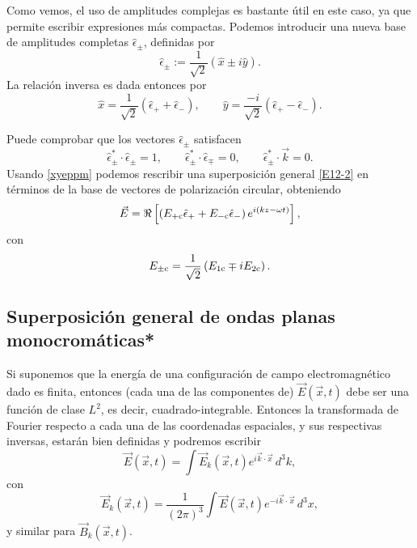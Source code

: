 Como vemos, el uso de amplitudes complejas es bastante útil en este caso, ya que permite escribir expresiones más compactas. Podemos introducir una nueva base de amplitudes completas $\hat\epsilon_\pm$, definidas por
\begin{equation}
\hat\epsilon_\pm := \frac{1}{\sqrt{2}}(\hat{x}\pm i\hat{y}).
\end{equation}
La relación inversa es dada entonces por
\begin{equation}\label{xyeppm}
\hat{x}=\frac{1}{\sqrt{2}}(\hat\epsilon_+ + \hat\epsilon_-), \qquad \hat{y}=\frac{-i}{\sqrt{2}}(\hat\epsilon_+ - \hat\epsilon_-).
\end{equation}

Puede comprobar que los vectores $\hat\epsilon_\pm$ satisfacen
\begin{equation}
\hat\epsilon_\pm^*\cdot\hat\epsilon_\pm = 1, \qquad
\hat\epsilon_\pm^*\cdot\hat\epsilon_\mp = 0, \qquad 
\hat\epsilon_\pm^*\cdot\vec{k} = 0.
\end{equation}
Usando \eqref{xyeppm} podemos rescribir una superposición general \eqref{E12-2} en términos de la base de vectores de polarización circular, obteniendo
\begin{equation}
\vec{E} = \Re\left[\left(E_{+\rm c}\hat\epsilon_+ + E_{-\rm c}\hat\epsilon_-\right)e^{i(kz-\omega t)}\right],
\end{equation}
con
\begin{equation}
E_{\pm\rm c} = \frac{1}{\sqrt{2}}\left(E_{1\rm c}\mp iE_{2\rm c}\right).
\end{equation}


\subsection{Superposición general de ondas planas monocromáticas*}
Si suponemos que la energía de una configuración de campo electromagnético dado es finita, entonces (cada una de las componentes de) $\vec{E}(\vec{x},t)$ debe ser una función de clase $L^2$, es decir, cuadrado-integrable. Entonces la transformada de Fourier respecto a cada una de las coordenadas espaciales, y sus respectivas inversas, estarán bien definidas y podremos escribir
\begin{equation}
\vec{E}(\vec{x},t)=\int\vec{E}_k(\vec{x},t)e^{i\vec{k}\cdot\vec{x}}\,d^3k,
\end{equation}
con
\begin{equation}
\vec{E}_k(\vec{x},t)=\frac{1}{(2\pi)^3}\int\vec{E}(\vec{x},t)e^{-i\vec{k}\cdot\vec{x}}\,d^3x,
\end{equation}
y similar para $\vec{B}_k(\vec{x},t)$.

